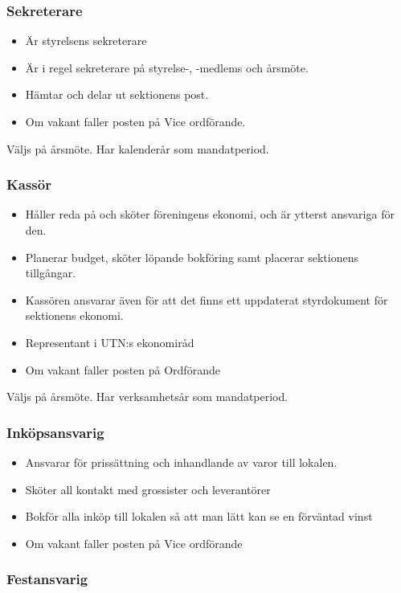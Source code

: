 \documentclass{../resources/dgovdoc}
\begin{document}
\subsubsection{Sekreterare}

\begin{itemize}
\item Är styrelsens sekreterare
\item Är i regel sekreterare på styrelse-, -medlems och årsmöte.
\item Hämtar och delar ut sektionens post.
\item Om vakant faller posten på Vice ordförande.
\end{itemize}
Väljs på årsmöte. Har kalenderår som mandatperiod. 

\subsubsection{Kassör}

\begin{itemize}
\item Håller reda på och sköter föreningens ekonomi, och är ytterst ansvariga för den. 
\item Planerar budget, sköter löpande bokföring samt placerar sektionens tillgångar. 
\item Kassören ansvarar även för att det finns ett uppdaterat styrdokument för sektionens ekonomi. 
\item Representant i UTN:s ekonomiråd
\item Om vakant faller posten på Ordförande
\end{itemize}
Väljs på årsmöte. Har verksamhetsår som mandatperiod. 

\subsubsection{Inköpsansvarig}

\begin{itemize}
\item Ansvarar för prissättning och inhandlande av varor till lokalen. 
\item Sköter all kontakt med grossister och leverantörer
\item Bokför alla inköp till lokalen så att man lätt kan se en förväntad vinst
\item Om vakant faller posten på Vice ordförande
\end{itemize}

\subsubsection{Festansvarig}
\end{document}
